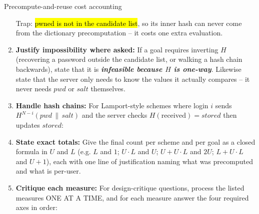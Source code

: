 \documentclass[12pt, a4paper]{article}
\newcommand{\term}[1]{\textbf{\textit{#1}}}        %
\newcommand{\imp}[1]{\hl{#1}}                       %
\begin{document}
\begin{schemebox}{Precompute-and-reuse cost accounting}
\begin{enumerate}[label=\textbf{Step \arabic*:}, leftmargin=*]
    Trap: \imp{pwned is not in the candidate list}, so its inner hash can never come from the dictionary precomputation -- it costs one extra evaluation.
    \item \textbf{Justify impossibility where asked:} If a goal requires inverting $H$ (recovering a password outside the candidate list, or walking a hash chain backwards), state that it is \term{infeasible because $H$ is one-way}.
    Likewise state that the server only needs to know the values it actually compares -- it never needs $pwd$ or $salt$ themselves.
    \item \textbf{Handle hash chains:} For Lamport-style schemes where login $i$ sends $H^{N-i}(pwd \,\|\, salt)$ and the server checks $H(\text{received}) = stored$ then updates $stored$:
    \item \textbf{State exact totals:} Give the final count per scheme and per goal as a closed formula in $U$ and $L$ (e.g. $L$ and $1$; $U \cdot L$ and $U$; $U + U \cdot L$ and $2U$; $L + U \cdot L$ and $U + 1$), each with one line of justification naming what was precomputed and what is per-user.
    \item \textbf{Critique each measure:} For design-critique questions, process the listed measures ONE AT A TIME, and for each measure answer the four required axes in order:
    \begin{tightitem}

\end{tightitem}
\end{enumerate}
\end{schemebox}
\end{document}
